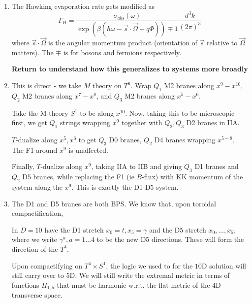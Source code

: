 \documentclass[11pt, class=article, crop=false]{standalone}
\begin{document}
\begin{enumerate}
	\item The Hawking evaporation rate gets modified as
	\[
		\Gamma_H = \frac{\sigma_{abs}(\omega)}{\exp(\beta (\hbar \omega - \vec s \cdot \vec \Omega - q \Phi))\mp 1} \frac{d^3 k}{(2\pi)^3}
	\]
	where $\vec s \cdot \vec \Omega$ is the angular momentum product (orientation of $\vec s$ relative to $\vec \Omega$ matters). The $\mp$ is for bosons and fermions respectively. 
	
	\textbf{Return to understand how this generalizes to systems more broadly}
	
	\item This is direct - we take $M$ theory on $T^6$. Wrap $Q_1$ M2 branes along $x^9-x^{10}$, $Q_2$ M2 branes along $x^7-x^8$, and $Q_3$ M2 branes along $x^5-x^6$. 
	
	Take the M-theory $S^1$ to be along $x^{10}$. Now, taking this to be microscopic first, we get $Q_1$ strings wrapping $x^9$ together with $Q_2, Q_3$ D2 branes in IIA. 
	
	$T$-dualize along $x^5,x^6$ to get $Q_3$ D0 branes, $Q_2$ D4 branes wrapping $x^{5-8}$. The F1 around $x^9$ is unaffected.
	
	Finally, $T$-dualize along $x^9$, taking IIA to IIB and giving $Q_3$ D1 branes and $Q_2$ D5 branes, while replacing the F1 (ie $B$-flux) with KK momentum of the system along the $x^9$. This is exactly the D1-D5 system.
	
	\item The D1 and D5 branes are both BPS. We know that, upon toroidal compactification, 
	
	In $D=10$ have the D1 stretch $x_0 = t, x_5 = \gamma$ and the D5 stretch $x_0, \dots, x_5$, where we write $\gamma^a, a=1 \dots 4$ to be the new D5 directions. These will form the direction of the $T^4$.
	
	Upon compactifying on $T^4 \times S^1$, the logic we used to for the $10$D solution will still carry over to $5$D. We will still write the extremal metric in terms of functions $H_{1,5}$ that must be harmonic w.r.t. the flat metric of the 4D transverse space.
	

\end{enumerate}
\end{document}
